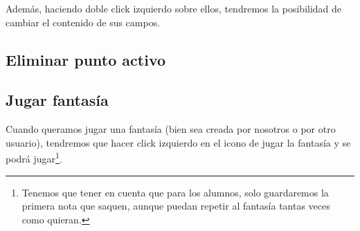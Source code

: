 Además, haciendo doble click izquierdo sobre ellos, tendremos la posibilidad de cambiar el contenido de sus campos.

\subsection{Eliminar punto activo}

\subsection{Jugar fantasía}
Cuando queramos jugar una fantasía (bien sea creada por nosotros o por otro usuario), tendremos que hacer click izquierdo en el icono de jugar la fantasía y se podrá jugar\footnote{Tenemos que tener en cuenta que para los alumnos, solo guardaremos la primera nota que saquen, aunque puedan repetir al fantasía tantas veces como quieran.}.
